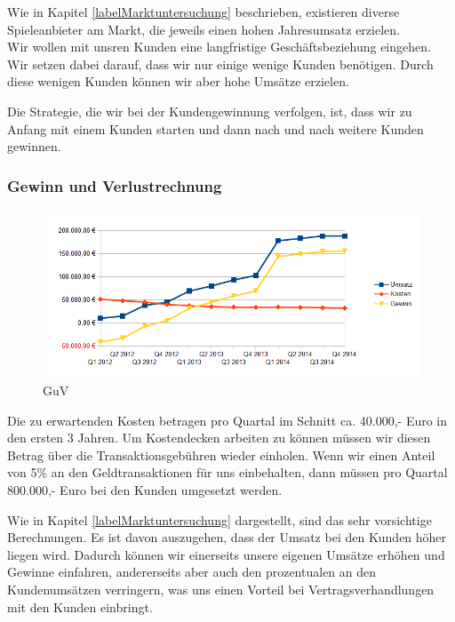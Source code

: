 Wie in Kapitel \ref{labelMarktuntersuchung} beschrieben, existieren diverse Spieleanbieter am Markt, die jeweils einen hohen Jahresumsatz erzielen. \\
Wir wollen mit unsren Kunden eine langfristige Geschäftsbeziehung eingehen. Wir setzen dabei darauf, dass wir nur einige wenige Kunden benötigen. Durch diese wenigen Kunden können wir aber hohe Umsätze erzielen.

Die Strategie, die wir bei der Kundengewinnung verfolgen, ist, dass wir zu Anfang mit einem Kunden starten und dann nach und nach weitere Kunden gewinnen. 

\subsubsection*{Gewinn und Verlustrechnung}

\begin{figure}[htbp]
	\centering
	\includegraphics[width=1\textwidth]{GuV.png} 
	\caption{GuV}
	\label{picGuV}
\end{figure}

Die zu erwartenden Kosten betragen pro Quartal im Schnitt ca{.} 40.000,- Euro in den ersten 3 Jahren. Um Kostendecken arbeiten zu können müssen wir diesen Betrag über die Transaktionsgebühren wieder einholen. Wenn wir einen Anteil von 5\% an den Geldtransaktionen für uns einbehalten, dann müssen pro Quartal 800.000,- Euro bei den Kunden umgesetzt werden. 

Wie in Kapitel \ref{labelMarktuntersuchung} dargestellt, sind das sehr vorsichtige Berechnungen. Es ist davon auszugehen, dass der Umsatz bei den Kunden höher liegen wird. Dadurch können wir einerseits unsere eigenen Umsätze erhöhen und Gewinne einfahren, andererseits aber auch den prozentualen an den Kundenumsätzen verringern, was uns einen Vorteil bei Vertragsverhandlungen mit den Kunden einbringt.

